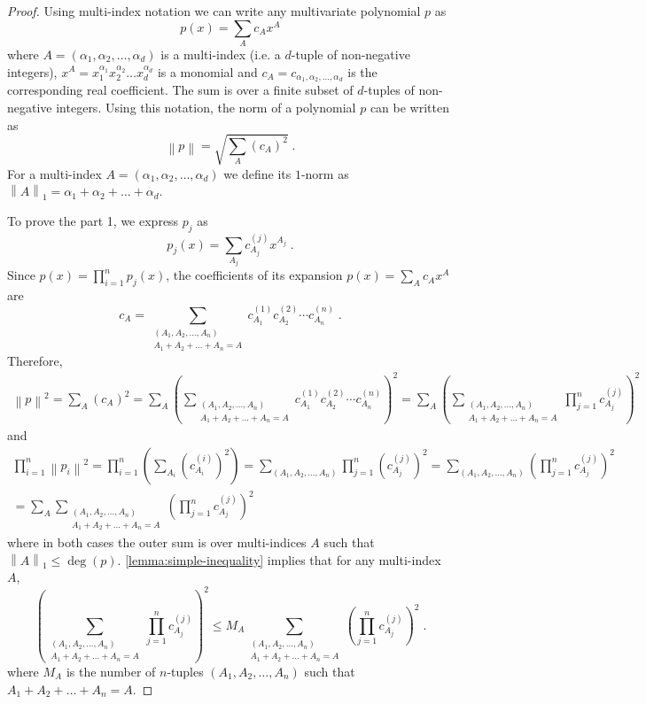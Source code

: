 \documentclass[12pt]{article}
\newcommand{\norm}[1]{\left\| #1 \right\|}  %
\begin{document}
\begin{proof}
Using multi-index notation we can write any multivariate polynomial $p$ as
$$
p(x) = \sum_A c_A x^A
$$
where $A = (\alpha_1, \alpha_2, \dots, \alpha_d)$ is a multi-index (i.e. a $d$-tuple of
non-negative integers), $x^A = x_1^{\alpha_1} x_2^{\alpha_2} \dots x_d^{\alpha_d}$ is a
monomial and $c_A = c_{\alpha_1, \alpha_2, \dots, \alpha_d}$ is the corresponding real
coefficient. The sum is over a finite subset of $d$-tuples of non-negative
integers. Using this notation, the norm of a polynomial $p$ can be written as
$$
\norm{p} = \sqrt{\sum_A (c_A)^2} \; .
$$
For a multi-index $A = (\alpha_1, \alpha_2, \dots, \alpha_d)$ we define its
$1$-norm as $\norm{A}_1 = \alpha_1 + \alpha_2 + \dots + \alpha_d$.

To prove the part 1, we express $p_j$ as
$$
p_j(x) = \sum_{A_j} c^{(j)}_{A_j} x^{A_j} \; .
$$
Since $p(x) = \prod_{i=1}^n p_j(x)$, the coefficients of its expansion $p(x) =
\sum_A c_A x^A$ are
$$
c_A = \sum_{\substack{(A_1, A_2, \dots, A_n) \\ A_1 + A_2 + \dots + A_n = A}} c^{(1)}_{A_1} c^{(2)}_{A_2} \cdots c^{(n)}_{A_n} \; .
$$
Therefore,
\begin{multline*}
\norm{p}^2
= \sum_{A} (c_A)^2
= \sum_{A} \left( \sum_{\substack{(A_1, A_2, \dots, A_n) \\ A_1 + A_2 + \dots + A_n = A}} c^{(1)}_{A_1} c^{(2)}_{A_2} \cdots c^{(n)}_{A_n} \right)^2
= \sum_{A} \left( \sum_{\substack{(A_1, A_2, \dots, A_n) \\ A_1 + A_2 + \dots + A_n = A}} \prod_{j=1}^n c^{(j)}_{A_j} \right)^2
\end{multline*}
and
\begin{multline*}
\prod_{i=1}^n \norm{p_i}^2
= \prod_{i=1}^n \left( \sum_{A_i} (c^{(i)}_{A_i})^2 \right)
= \sum_{(A_1, A_2, \dots, A_n)} \prod_{j=1}^n (c^{(j)}_{A_j})^2
= \sum_{(A_1, A_2, \dots, A_n)} \left( \prod_{j=1}^n c^{(j)}_{A_j} \right)^2 \\
= \sum_A \sum_{\substack{(A_1, A_2, \dots, A_n) \\ A_1 + A_2 + \dots + A_n = A}} \left( \prod_{j=1}^n c^{(j)}_{A_j} \right)^2
\end{multline*}
where in both cases the outer sum is over multi-indices $A$ such that $\norm{A}_1 \le \deg(p)$.
\autoref{lemma:simple-inequality} implies that for any multi-index $A$,
$$
\left( \sum_{\substack{(A_1, A_2, \dots, A_n) \\ A_1 + A_2 + \dots + A_n = A}} \prod_{j=1}^n c^{(j)}_{A_j} \right)^2
\le M_A \sum_{\substack{(A_1, A_2, \dots, A_n) \\ A_1 + A_2 + \dots + A_n = A}} \left( \prod_{j=1}^n c^{(j)}_{A_j} \right)^2 \; .
$$
where $M_A$ is the number of $n$-tuples $(A_1, A_2, \dots, A_n)$ such that $A_1 +
A_2 + \dots + A_n = A$.


\end{proof}
\end{document}
